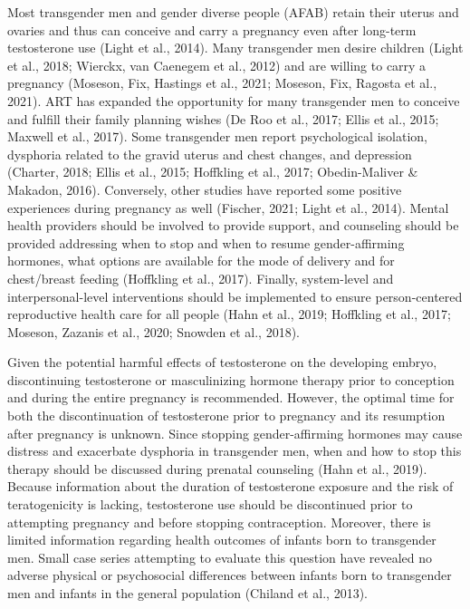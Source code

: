 \documentclass[
]{book}
\begin{document}
Most transgender men and gender diverse people (AFAB) retain their uterus and ovaries and
thus can conceive and carry a pregnancy even
after long-term testosterone use (Light et al., 2014).
Many transgender men desire children (Light
et al., 2018; Wierckx, van Caenegem et al., 2012)
and are willing to carry a pregnancy (Moseson,
Fix, Hastings et al., 2021; Moseson, Fix, Ragosta
et al., 2021). ART has expanded the opportunity
for many transgender men to conceive and fulfill
their family planning wishes (De Roo et al., 2017;
Ellis et al., 2015; Maxwell et al., 2017). Some transgender men report psychological isolation, dysphoria related to the gravid uterus and chest
changes, and depression (Charter, 2018; Ellis et al.,
2015; Hoffkling et al., 2017; Obedin-Maliver \&
Makadon, 2016). Conversely, other studies have
reported some positive experiences during pregnancy as well (Fischer, 2021; Light et al., 2014).
Mental health providers should be involved to
provide support, and counseling should be
provided addressing when to stop and when to
resume gender-affirming hormones, what options
are available for the mode of delivery and for
chest/breast feeding (Hoffkling et al., 2017). Finally,
system-level and interpersonal-level interventions
should be implemented to ensure person-centered
reproductive health care for all people (Hahn
et al., 2019; Hoffkling et al., 2017; Moseson,
Zazanis et al., 2020; Snowden et al., 2018).

Given the potential harmful effects of testosterone on the developing embryo, discontinuing
testosterone or masculinizing hormone therapy
prior to conception and during the entire pregnancy is recommended. However, the optimal
time for both the discontinuation of testosterone
prior to pregnancy and its resumption after pregnancy is unknown. Since stopping gender-affirming
hormones may cause distress and exacerbate dysphoria in transgender men, when and how to
stop this therapy should be discussed during prenatal counseling (Hahn et al., 2019). Because
information about the duration of testosterone
exposure and the risk of teratogenicity is lacking,
testosterone use should be discontinued prior to
attempting pregnancy and before stopping contraception. Moreover, there is limited information
regarding health outcomes of infants born to
transgender men. Small case series attempting to
evaluate this question have revealed no adverse
physical or psychosocial differences between
infants born to transgender men and infants in
the general population (Chiland et al., 2013).
\end{document}

